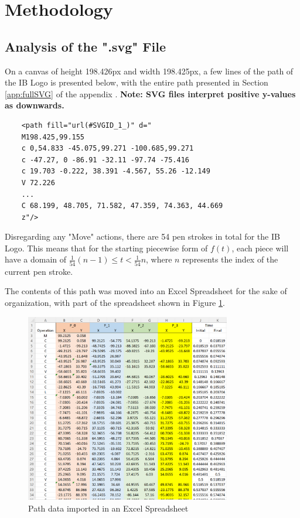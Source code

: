 \documentclass[letterpaper, 12pt]{article}
\begin{document}
\section{Methodology}

\subsection{Analysis of the ".svg" File} \label{svgAnalysis}

On a canvas of height 198.426px and width 198.425px,
a few lines of the path of the IB Logo is presented below,
with the entire path presented in Section \ref*{app:fullSVG}
of the appendix
\cite{internationalbaccalaureateorganisationInternationalBaccalaureateLogo2013}. \textbf{Note: SVG files interpret positive y-values as downwards.}

\begin{verbatim}
    <path fill="url(#SVGID_1_)" d="
    M198.425,99.155
    c 0,54.833 -45.075,99.271 -100.685,99.271
    c -47.27, 0 -86.91 -32.11 -97.74 -75.416
    c 19.703 -0.222, 38.391 -4.567, 55.26 -12.149
    V 72.226
    ...
    C 68.199, 48.705, 71.582, 47.359, 74.363, 44.669
    z"/>
\end{verbatim}

Disregarding any "Move" actions, there are 54 pen strokes
in total for the IB Logo. This means that for the starting piecewise
form of \(f(t)\), each piece will have a domain of \(\frac{1}{54}(n-1) \le t < \frac{1}{54}n\),
where \(n\) represents the index of the current pen stroke.

The contents of this path was moved into an Excel Spreadsheet for
the sake of organization, with part of the spreadsheet shown
in Figure \ref*{fig:svgxlsx}.

\begin{figure}[H]
    \centering
    \includegraphics[width=0.8\textwidth]{svgxlsx.png}
    \caption{Path data imported in an Excel Spreadsheet}
    \label{fig:svgxlsx}
\end{figure}
\end{document}

